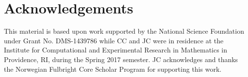 \documentclass[a4paper,11pt]{article}
\begin{document}


\section{Acknowledgements}
This material is based upon work supported by the National Science
Foundation under Grant No. DMS-1439786 while CC and JC were in
residence at the Institute for Computational and Experimental Research
in Mathematics in Providence, RI, during the Spring 2017 semester.
JC acknowledges and thanks the Norwegian Fulbright Core Scholar
Program for supporting this work.



\end{document}
